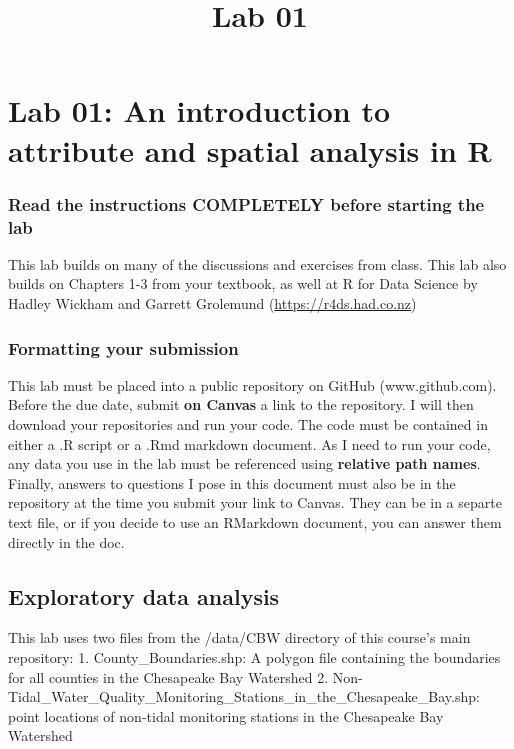 \documentclass[]{article}
\title{Lab 01}
\author{}
\date{}
\makeatletter
\renewcommand{\maketitle}{\bgroup\vspace*{-1cm}\setlength{\parindent}{0pt}
\begin{flushleft}
  \@author
  
  \@date
  
\end{flushleft}\egroup
}
\makeatother
\begin{document}
\maketitle

\section{Lab 01: An introduction to attribute and spatial analysis in
R}\label{lab-01-an-introduction-to-attribute-and-spatial-analysis-in-r}

\subsubsection{Read the instructions COMPLETELY before starting the
lab}\label{read-the-instructions-completely-before-starting-the-lab}

This lab builds on many of the discussions and exercises from class.
This lab also builds on Chapters 1-3 from your textbook, as well at R
for Data Science by Hadley Wickham and Garrett Grolemund
(\url{https://r4ds.had.co.nz})

\subsubsection{Formatting your
submission}\label{formatting-your-submission}

This lab must be placed into a public repository on GitHub
(www.github.com). Before the due date, submit \textbf{on Canvas} a link
to the repository. I will then download your repositories and run your
code. The code must be contained in either a .R script or a .Rmd
markdown document. As I need to run your code, any data you use in the
lab must be referenced using \textbf{relative path names}. Finally,
answers to questions I pose in this document must also be in the
repository at the time you submit your link to Canvas. They can be in a
separte text file, or if you decide to use an RMarkdown document, you
can answer them directly in the doc.

\subsection{Exploratory data analysis}\label{exploratory-data-analysis}

This lab uses two files from the /data/CBW directory of this course's
main repository: 1. County\_Boundaries.shp: A polygon file containing
the boundaries for all counties in the Chesapeake Bay Watershed 2.
Non-Tidal\_Water\_Quality\_Monitoring\_Stations\_in\_the\_Chesapeake\_Bay.shp:
point locations of non-tidal monitoring stations in the Chesapeake Bay
Watershed
\end{document}
